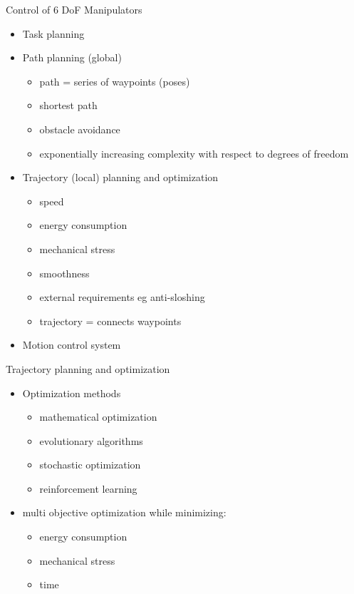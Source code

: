 \documentclass[de]{sdqbeamer}
\begin{document}
\begin{frame}{Control of 6 DoF Manipulators}
    \begin{itemize}
        \item Task planning
        \item Path planning (global)
        \begin{itemize}
            \item path = series of waypoints (poses)
            \item shortest path
            \item obstacle avoidance
            \item exponentially increasing complexity with respect to degrees of freedom
        \end{itemize}
        \item Trajectory (local) planning and optimization
        \begin{itemize}
            \item speed
            \item energy consumption
            \item mechanical stress
            \item smoothness
            \item external requirements eg anti-sloshing
            \item trajectory = connects waypoints
        \end{itemize}
        \item Motion control system
    \end{itemize}        
\end{frame}


\begin{frame}{Trajectory planning and optimization}
    \begin{itemize}
        \item Optimization methods
        \begin{itemize}
            \item mathematical optimization
            \item evolutionary algorithms
            \item stochastic optimization
            \item reinforcement learning
        \end{itemize}
        \item multi objective optimization while minimizing:
        \begin{itemize}
            \item energy consumption
            \item mechanical stress
            \item time
        \end{itemize}
    \end{itemize}        
\end{frame}
\end{document}
